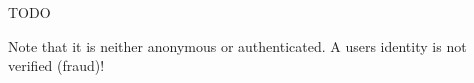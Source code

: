
TODO

Note that it is neither anonymous or authenticated. A users identity is not
verified (fraud)!
